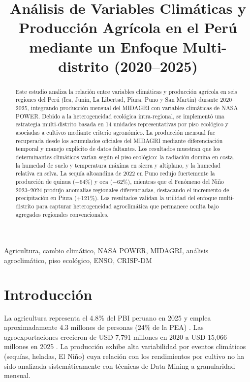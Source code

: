 \documentclass[conference]{IEEEtran}
\begin{document}
\title{Análisis de Variables Climáticas y Producción Agrícola en el Perú mediante un Enfoque Multi-distrito (2020--2025)}

\author{
}

\maketitle

\begin{abstract}
Este estudio analiza la relación entre variables climáticas y producción agrícola en seis regiones del Perú (Ica, Junín, La Libertad, Piura, Puno y San Martín) durante 2020--2025, integrando producción mensual del MIDAGRI con variables climáticas de NASA POWER. Debido a la heterogeneidad ecológica intra-regional, se implementó una estrategia multi-distrito basada en 14 unidades representativas por piso ecológico y asociadas a cultivos mediante criterio agronómico. La producción mensual fue recuperada desde los acumulados oficiales del MIDAGRI mediante diferenciación temporal y manejo explícito de datos faltantes. Los resultados muestran que los determinantes climáticos varían según el piso ecológico: la radiación domina en costa, la humedad de suelo y temperatura máxima en sierra y altiplano, y la humedad relativa en selva. La sequía altoandina de 2022 en Puno redujo fuertemente la producción de quinua ($-64\%$) y oca ($-62\%$), mientras que el Fenómeno del Niño 2023--2024 produjo anomalías regionales diferenciadas, destacando el incremento de precipitación en Piura (+121\%). Los resultados validan la utilidad del enfoque multi-distrito para capturar heterogeneidad agroclimática que permanece oculta bajo agregados regionales convencionales.
\end{abstract}

\begin{IEEEkeywords}
Agricultura, cambio climático, NASA POWER, MIDAGRI, análisis agroclimático, piso ecológico, ENSO, CRISP-DM
\end{IEEEkeywords}

\section{Introducción}
La agricultura representa el 4.8\% del PBI peruano en 2025 \cite{bcrp2025} y emplea aproximadamente 4.3 millones de personas (24\% de la PEA) \cite{inei2024}. Las agroexportaciones crecieron de USD 7,791 millones en 2020 a USD 15,066 millones en 2025 \cite{adex2026}. La producción exhibe alta variabilidad por eventos climáticos (sequías, heladas, El Niño) cuya relación con los rendimientos por cultivo no ha sido analizada sistemáticamente con técnicas de Data Mining a granularidad mensual.
\end{document}
